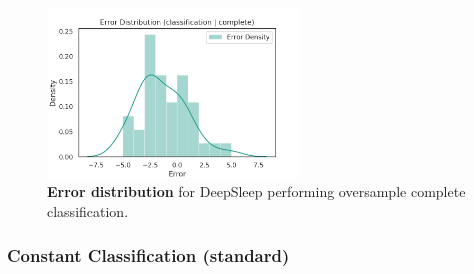 \documentclass[11pt]{scrartcl}
\begin{document}
\begin{figure}[hbt]
	\centering
	\includegraphics[width=0.6\textwidth]{img/learning/original_gdansk_sleepnet_classification_complete_oversample_unweighted_error_distribution.png}
	\caption{\textcolor{viridis5}{\textbf{Error distribution}} for DeepSleep performing oversample complete classification.}
	\label{fig:original_gdansk_sleepnet_classification_complete_oversample_unweighted_error_distribution}
\end{figure}

\FloatBarrier




\FloatBarrier
\subsubsection{Constant Classification (standard)}
\end{document}

